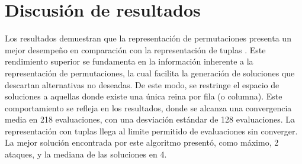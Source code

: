 \documentclass[runningheads]{llncs}
\begin{document}
\section{Discusión de resultados}

Los resultados demuestran que la representación de permutaciones presenta un mejor desempeño en comparación con la representación de tuplas . Este rendimiento superior se fundamenta en la información inherente a la representación de permutaciones, la cual facilita la generación de soluciones que descartan alternativas no deseadas. De este modo, se restringe el espacio de soluciones a aquellas donde existe una única reina por fila (o columna).  Este comportamiento se refleja en los resultados, donde se alcanza una convergencia media en 218 evaluaciones, con una desviación estándar de 128 evaluaciones.  La representación con tuplas llega al limite permitido de evaluaciones sin converger. La mejor solución encontrada por este algoritmo presentó, como máximo, 2 ataques, y la mediana de las soluciones en 4. 
\end{document}
